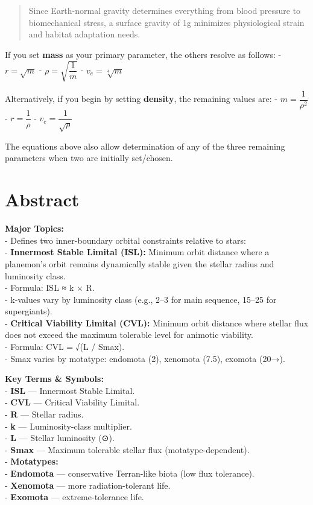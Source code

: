 \documentclass[
  letterpaper,
]{book}
\begin{document}
\begin{quote}
Since Earth-normal gravity determines everything from blood pressure to
biomechanical stress, a surface gravity of 1g minimizes physiological
strain and habitat adaptation needs.
\end{quote}

If you set \textbf{mass} as your primary parameter, the others resolve
as follows: - \(r=\sqrt{m}\) - \(\rho=\sqrt{\dfrac{1}{m}}\) -
\(v_e=\sqrt[4]{m}\)

Alternatively, if you begin by setting \textbf{density}, the remaining
values are: - \(m=\dfrac{1}{\rho^2}\) - \(r=\dfrac{1}{\rho}\) -
\(v_e=\dfrac{1}{\sqrt{\rho}}\)

The equations above also allow determination of any of the three
remaining parameters when two are initially set/chosen.

\section{Abstract}\label{abstract-24}

\textbf{Major Topics:}\\
- Defines two inner-boundary orbital constraints relative to stars:\\
- \textbf{Innermost Stable Limital (ISL):} Minimum orbit distance where
a planemon's orbit remains dynamically stable given the stellar radius
and luminosity class.\\
- Formula: ISL ≈ k × R.\\
- k-values vary by luminosity class (e.g., 2--3 for main sequence,
15--25 for supergiants).\\
- \textbf{Critical Viability Limital (CVL):} Minimum orbit distance
where stellar flux does not exceed the maximum tolerable level for
animotic viability.\\
- Formula: CVL = √(L / Smax).\\
- Smax varies by motatype: endomota (2), xenomota (7.5), exomota (20→).

\textbf{Key Terms \& Symbols:}\\
- \textbf{ISL} --- Innermost Stable Limital.\\
- \textbf{CVL} --- Critical Viability Limital.\\
- \textbf{R} --- Stellar radius.\\
- \textbf{k} --- Luminosity-class multiplier.\\
- \textbf{L} --- Stellar luminosity (⊙).\\
- \textbf{Smax} --- Maximum tolerable stellar flux
(motatype-dependent).\\
- \textbf{Motatypes:}\\
- \textbf{Endomota} --- conservative Terran-like biota (low flux
tolerance).\\
- \textbf{Xenomota} --- more radiation-tolerant life.\\
- \textbf{Exomota} --- extreme-tolerance life.
\end{document}
